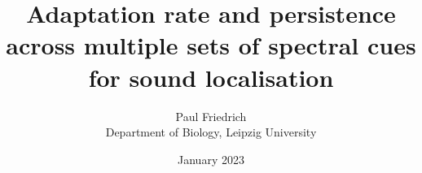 \documentclass[12pt]{article}
\newcommand\thesistitle{Adaptation rate and persistence across multiple sets of spectral cues for sound localisation} %
\begin{document}
\title{\thesistitle}%
\author{Paul Friedrich\\Department of Biology, Leipzig University}
\date{January 2023}
\maketitle









\nocite{*}

\end{document}
